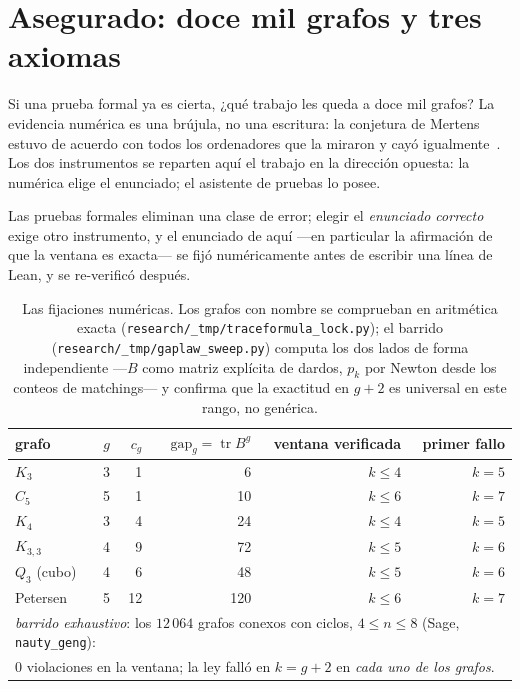 \documentclass[11pt]{article}
\newcommand{\lean}[1]{\texttt{#1}}
\DeclareMathOperator{\tr}{tr}
\begin{document}
\section{Asegurado: doce mil grafos y tres axiomas}
\label{sec:verification}

Si una prueba formal ya es cierta, ¿qué trabajo les queda a doce mil grafos? La evidencia
numérica es una brújula, no una escritura: la conjetura de Mertens estuvo de acuerdo con
todos los ordenadores que la miraron y cayó igualmente~\cite{OdlyzkoTeRiele1985}.
Los dos instrumentos se reparten aquí el trabajo en la dirección opuesta: la numérica elige
el enunciado; el asistente de pruebas lo posee.

Las pruebas formales eliminan una clase de error; elegir el \emph{enunciado correcto} exige
otro instrumento, y el enunciado de aquí ---en particular la afirmación de que la ventana es
exacta--- se fijó numéricamente antes de escribir una línea de Lean, y se re-verificó
después.

\begin{table}[h]
\centering\small
{}
\begin{tabular}{@{}lrrrrr@{}}
\toprule
\rowcolor{ggteal!18} grafo & $g$ & $c_g$ & $\mathrm{gap}_g = \tr B^g$ & ventana verificada & primer fallo \\
\midrule
$K_3$        & 3 & 1  & 6   & $k \le 4$ & $k=5$ \\
$C_5$        & 5 & 1  & 10  & $k \le 6$ & $k=7$ \\
$K_4$        & 3 & 4  & 24  & $k \le 4$ & $k=5$ \\
$K_{3,3}$    & 4 & 9  & 72  & $k \le 5$ & $k=6$ \\
$Q_3$ (cubo) & 4 & 6  & 48  & $k \le 5$ & $k=6$ \\
Petersen     & 5 & 12 & 120 & $k \le 6$ & $k=7$ \\
\midrule
\multicolumn{6}{l}{\emph{barrido exhaustivo}: los $12\,064$ grafos conexos con ciclos, $4 \le n \le 8$
(Sage, \lean{nauty\_geng}):} \\
\multicolumn{6}{l}{\quad $0$ violaciones en la ventana; la ley falló en $k = g+2$ en
\emph{cada uno de los grafos}.} \\
\bottomrule
\end{tabular}
\caption{Las fijaciones numéricas. Los grafos con nombre se comprueban en aritmética exacta
(\lean{research/\_tmp/traceformula\_lock.py}); el barrido
(\lean{research/\_tmp/gaplaw\_sweep.py}) computa los dos lados de forma independiente
---$B$ como matriz explícita de dardos, $p_k$ por Newton desde los conteos de matchings--- y
confirma que la exactitud en $g+2$ es universal en este rango, no genérica.}
\label{tab:locks}
\end{table}
\end{document}
